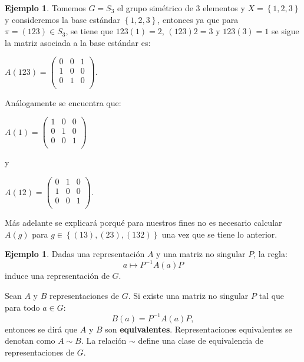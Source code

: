 \documentclass[12pt]{book}
\theoremstyle{definition}
\newtheorem{example}[theorem]{Ejemplo}
\newcounter{in}
\begin{document}
\begin{example}
Tomemos $G = S_3$ el grupo simétrico de $3$ elementos y
$X = \left \{ 1, 2, 3 \right \}$ y consideremos la base estándar
$\left \{ 1, 2, 3 \right \}$, entonces ya que para
$\pi = (123) \in S_3$, se tiene que $123(1) = 2$, $(123)2 = 3$ y
$123(3) = 1$ se sigue la matriz asociada a la base estándar es:
\begin{center}  
     $A(123)=\begin{pmatrix}
       0 & 0 & 1 \\
       1 & 0 & 0 \\
       0 & 1 & 0 \\
      \end{pmatrix}.$
\end{center}
Análogamente se encuentra que:
\begin{center}  
     $A(1)=\begin{pmatrix}
       1 & 0 & 0 \\
       0 & 1 & 0 \\
       0 & 0 & 1 \\
      \end{pmatrix}$
\end{center}
y
\begin{center}  
     $A(12)=\begin{pmatrix}
       0 & 1 & 0 \\
       1 & 0 & 0 \\
       0 & 0 & 1 \\
      \end{pmatrix}.$
\end{center}
\end{example}
Más adelante se explicará porqué para nuestros fines no es necesario
calcular $A(g)$ para $g \in \left \{ (13),(23),(132) \right \}$ una
vez que se tiene lo anterior.
\begin{example}
  \label{Ej5}
  Dadas una representación $A$ y una matriz no singular $P$, la regla:
  \begin{equation*}
    a \mapsto P^{-1}A\left(a\right)P
  \end{equation*}  
  induce una representación de $G$.

  Sean $A$ y $B$ representaciones de $G$. Si existe una
  matriz no singular $P$ tal que para todo $a \in G$:
  \begin{equation*}
    B\left(a\right)= P^{-1}A\left(a\right)P,
  \end{equation*}
  entonces se dirá que $A$ y $B$ son
  \textbf{equivalentes}. Representaciones equivalentes se denotan como
  $A \sim B$. La relación $\sim$ define una clase de equivalencia de
  representaciones de $G$.
\end{example}
\end{document}

